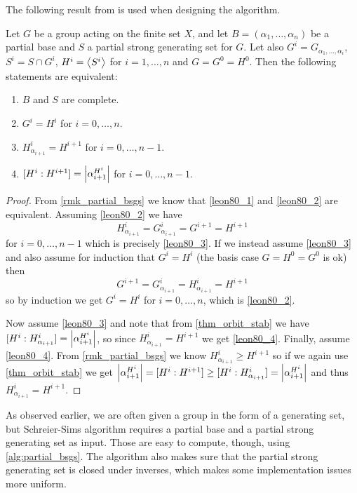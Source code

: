  The following result from \cite{leon80} is used when designing the algorithm.
\begin{theorem}
  Let $G$ be a group acting on the finite set $X$, and let $B =
  (\alpha_1, \dotsc, \alpha_n)$ be a partial base and $S$ a partial
  strong generating set for $G$. Let also $G^i = G_{\alpha_1, \dotsc,
    \alpha_i}$, $S^i = S \cap G^i$, $H^i = \left\langle S^i \right\rangle$ for $i = 1,
  \dotsc, n$ and $G = G^0 = H^0$. Then the following statements are equivalent:
\begin{enumerate}
\item $B$ and $S$ are complete. \label{leon80_1}
\item $G^i = H^i$ for $i = 0, \dotsc, n$. \label{leon80_2}
\item $H^i_{\alpha_{i + 1}} = H^{i + 1}$ for $i = 0, \dotsc, n - 1$. \label{leon80_3}
\item $[H^i : H^{i + 1}] = \left\lvert \alpha_{i+1}^{H^i} \right\rvert$ for $i = 0, \dotsc, n - 1$. \label{leon80_4}
\end{enumerate}
\end{theorem}
\begin{proof}
From \ref{rmk_partial_bsgs} we know that \eqref{leon80_1} and \eqref{leon80_2} are equivalent. Assuming \eqref{leon80_2} we have
\begin{equation}
H^i_{\alpha_{i + 1}} = G^i_{\alpha_{i + 1}} = G^{i + 1} = H^{i + 1}
\end{equation}
for $i = 0, \dotsc, n - 1$ which is precisely \eqref{leon80_3}. If we instead assume \eqref{leon80_3} and also assume for induction that $G^i = H^i$ (the basis case $G = H^0 = G^0$ is ok) then
\begin{equation}
G^{i + 1} = G^i_{\alpha_{i + 1}} = H^i_{\alpha_{i + 1}} = H^{i + 1}
\end{equation}
so by induction we get $G^i = H^i$ for $i = 0, \dotsc, n$, which is \eqref{leon80_2}.

Now assume \eqref{leon80_3} and note that from \ref{thm_orbit_stab} we
have $[H^i : H^i_{\alpha_{i + 1}}] = \left\lvert \alpha_{i+1}^{H^i} \right\rvert$, so
since $H^i_{\alpha_{i + 1}} = H^{i + 1}$ we get \eqref{leon80_4}.
Finally, assume \eqref{leon80_4}. From \ref{rmk_partial_bsgs} we know
$H^i_{\alpha_{i + 1}} \geq H^{i + 1}$ so if we again use
\ref{thm_orbit_stab} we get $\left\lvert \alpha_{i+1}^{H^i} \right\rvert = [H^i : H^{i +
  1}] \geq [H^i : H^i_{\alpha_{i + 1}}] = \left\lvert \alpha_{i+1}^{H^i} \right\rvert$
and thus $H^i_{\alpha_{i + 1}} = H^{i + 1}$.
\end{proof}

As observed earlier, we are often given a group in the form of a generating set, but Schreier-Sims algorithm requires a partial base and a partial strong generating set as input. Those are easy to compute, though, using \ref{alg:partial_bsgs}. The algorithm also makes sure that the partial strong generating set is closed under inverses, which makes some implementation issues more uniform.

